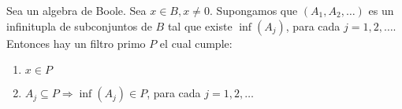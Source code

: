 \begin{theorem}
  Sea \algBoole un algebra de Boole. Sea $x \in B, x \neq 0$. Supongamos que $(A_1, A_2, \dots)$ es un infinitupla 
  de subconjuntos de $B$ tal que existe $\inf(A_j)$, para cada $j = 1, 2, \dots$. Entonces hay un filtro primo $P$ 
  el cual cumple:
  \begin{enumerate}
    \item $x \in P$
    \item $A_j \subseteq P \Rightarrow \inf(A_j) \in P$, para cada $j = 1, 2, \dots$
  \end{enumerate}
\end{theorem}
\noproof
